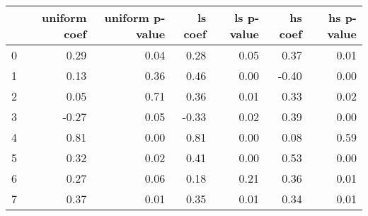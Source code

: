 \begin{tabular}{lrrrrrr}
\toprule
 & uniform coef & uniform p-value & ls coef & ls p-value & hs coef & hs p-value \\
\midrule
0 & 0.29 & 0.04 & 0.28 & 0.05 & 0.37 & 0.01 \\
1 & 0.13 & 0.36 & 0.46 & 0.00 & -0.40 & 0.00 \\
2 & 0.05 & 0.71 & 0.36 & 0.01 & 0.33 & 0.02 \\
3 & -0.27 & 0.05 & -0.33 & 0.02 & 0.39 & 0.00 \\
4 & 0.81 & 0.00 & 0.81 & 0.00 & 0.08 & 0.59 \\
5 & 0.32 & 0.02 & 0.41 & 0.00 & 0.53 & 0.00 \\
6 & 0.27 & 0.06 & 0.18 & 0.21 & 0.36 & 0.01 \\
7 & 0.37 & 0.01 & 0.35 & 0.01 & 0.34 & 0.01 \\
\bottomrule
\end{tabular}
